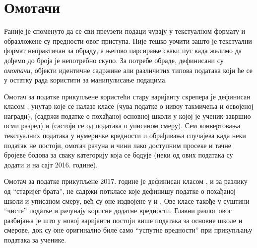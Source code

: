\section{Омотачи}

Раније је споменуто да се сви преузети подаци чувају у текстуалном формату и образложене су предности овог приступа. Није тешко уочити зашто је текстуални формат непрактичан за обраду, а његово парсирање сваки пут када желимо да дођемо до броја је непотребно скупо. За потребе обраде, дефинисани су \emph{омотачи}, објекти идентичне садржине али различитих типова података који ће се у остатку рада користити за манипулисање подацима.

Омотач за податке прикупљене користећи стару варијанту скрепера је дефинисан класом , унутар које се налазе класе  (чува податке о нивоу такмичења и освојеној награди),  (садржи податке о похађаној основној школи у којој је ученик завршио осми разред) и  (састоји се од података о уписаном смеру). Сем конвертовања текстуалних података у нумеричке вредности и обрађивања случајева када неки податак не постоји, омотач рачуна и чини лако доступним просеке и тачне бројеве бодова за сваку категорију која се бодује (неки од ових података су додати и на сајт 2016. године).

Омотач за податке прикупљене 2017. године је дефинисан класом , и за разлику од \enquote{старијег брата}, не садржи поткласе које дефинишу податке о похађаној школи и уписаном смеру, већ су оне издвојене у  и . Ове класе такође у суштини \enquote{чисте} податке и рачунају корисне додатне вредности. Главни разлог овог разбијања је што у новој варијанти постоји више података за основне школе и смерове, док су оне оригинално биле само \enquote{успутне вредности} при прикупљању података за ученике.